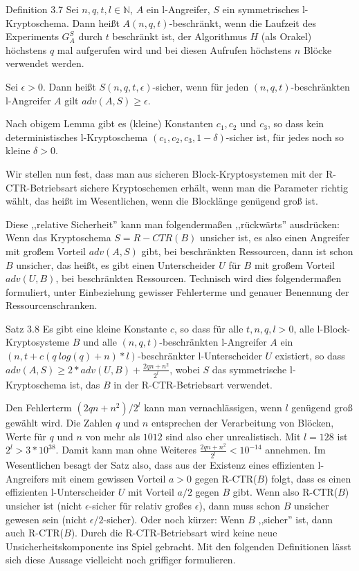 \documentclass[a4paper]{article}
\begin{document}
\begin{multicols}{3}
    Definition 3.7 Sei $n,q,t,l\in\mathbb{N}$, $A$ ein l-Angreifer, $S$ ein symmetrisches l-Kryptoschema. Dann heißt $A(n,q,t)$-beschränkt, wenn die Laufzeit des Experiments $G^S_A$ durch $t$ beschränkt ist, der Algorithmus $H$ (als Orakel) höchstens $q$ mal aufgerufen wird und bei diesen Aufrufen höchstens $n$ Blöcke verwendet werden.

    Sei $\epsilon> 0$. Dann heißt $S(n,q,t,\epsilon)$-sicher, wenn für jeden $(n,q,t)$-beschränkten l-Angreifer $A$ gilt $adv(A,S)\geq\epsilon$.

    Nach obigem Lemma gibt es (kleine) Konstanten $c_1,c_2$ und $c_3$, so dass kein deterministisches l-Kryptoschema $(c_1,c_2,c_3,1-\delta)$-sicher ist, für jedes noch so kleine $\delta > 0$.

    Wir stellen nun fest, dass man aus sicheren Block-Kryptosystemen mit der R-CTR-Betriebsart sichere Kryptoschemen erhält, wenn man die Parameter richtig wählt, das heißt im Wesentlichen, wenn die Blocklänge genügend groß ist.

    Diese ,,relative Sicherheit'' kann man folgendermaßen ,,rückwärts'' ausdrücken: Wenn das Kryptoschema $S=R-CTR(B)$ unsicher ist, es also einen Angreifer mit großem Vorteil $adv(A,S)$ gibt, bei beschränkten Ressourcen, dann ist schon $B$ unsicher, das heißt, es gibt einen Unterscheider $U$ für $B$ mit großem Vorteil $adv(U,B)$, bei beschränkten Ressourcen. Technisch wird dies folgendermaßen formuliert, unter Einbeziehung gewisser Fehlerterme und genauer Benennung der Ressourcenschranken.

    Satz 3.8 Es gibt eine kleine Konstante $c$, so dass für alle $t,n,q,l > 0$, alle l-Block-Kryptosysteme $B$ und alle $(n,q,t)$-beschränkten l-Angreifer $A$ ein $(n,t+c(q\ log(q) +n)*l)$-beschränkter l-Unterscheider $U$ existiert, so dass $adv(A,S)\geq 2 *adv(U,B) + \frac{2 qn+n^2}{2^l}$, wobei $S$ das symmetrische l-Kryptoschema ist, das $B$ in der R-CTR-Betriebsart verwendet.

    Den Fehlerterm $(2qn+n^2)/2^l$ kann man vernachlässigen, wenn $l$ genügend groß gewählt wird. Die Zahlen $q$ und $n$ entsprechen der Verarbeitung von Blöcken, Werte für $q$ und $n$ von mehr als $1012$ sind also eher unrealistisch. Mit $l=128$ ist $2^l> 3 * 10^{38}$. Damit kann man ohne Weiteres $\frac{2qn+n^2}{2^l} <10^{-14}$ annehmen. Im Wesentlichen besagt der Satz also, dass aus der Existenz eines effizienten l-Angreifers mit einem gewissen Vorteil $a>0$ gegen R-CTR($B$) folgt, dass es einen effizienten l-Unterscheider $U$ mit Vorteil $a/2$ gegen $B$ gibt. Wenn also R-CTR($B$) unsicher ist (nicht $\epsilon$-sicher für relativ großes $\epsilon$), dann muss schon $B$ unsicher gewesen sein (nicht $\epsilon/2$-sicher). Oder noch kürzer: Wenn $B$ ,,sicher'' ist, dann auch R-CTR($B$). Durch die R-CTR-Betriebsart wird keine neue Unsicherheitskomponente ins Spiel gebracht.
    Mit den folgenden Definitionen lässt sich diese Aussage vielleicht noch griffiger formulieren.


\end{multicols}
\end{document}
